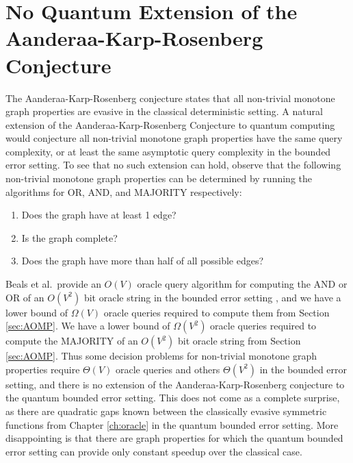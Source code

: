 \section{No Quantum Extension of the Aanderaa-Karp-Rosenberg Conjecture}
\label{sec:arkbad}

The Aanderaa-Karp-Rosenberg conjecture states that all non-trivial
monotone graph properties are evasive in the classical deterministic
setting.  A natural extension of the Aanderaa-Karp-Rosenberg
Conjecture to quantum computing would conjecture all non-trivial
monotone graph properties have the same query complexity, or at least
the same asymptotic query complexity in the bounded error setting.  To
see that no such extension can hold, observe that the following
non-trivial monotone graph properties can be determined by running the
algorithms for OR, AND, and MAJORITY respectively:

\begin{enumerate}
\item Does the graph have at least 1 edge?
\item Is the graph complete?
\item Does the graph have more than half of all possible edges?
\end{enumerate}

Beals et al.\ provide an $O(V)$ oracle query algorithm for computing
the AND or OR of an $O(V^{2})$ bit oracle string in the bounded error
setting \cite{beals98quantum}, and we have a lower bound of
$\Omega(V)$ oracle queries required to compute them from Section
\ref{sec:AOMP}.  We have a lower bound of $\Omega(V^{2})$ oracle 
queries required to compute the MAJORITY of an $O(V^{2})$ bit oracle
string from Section \ref{sec:AOMP}.  Thus some decision problems for
non-trivial monotone graph properties require $\Theta(V)$ oracle
queries and others $\Theta(V^{2})$ in the bounded error setting, and
there is no extension of the Aanderaa-Karp-Rosenberg conjecture to the
quantum bounded error setting.  This does not come as a complete
surprise, as there are quadratic gaps known between the classically
evasive symmetric functions from Chapter \ref{ch:oracle} in the
quantum bounded error setting.  More disappointing is that there are
graph properties for which the quantum bounded error setting can
provide only constant speedup over the classical case.
